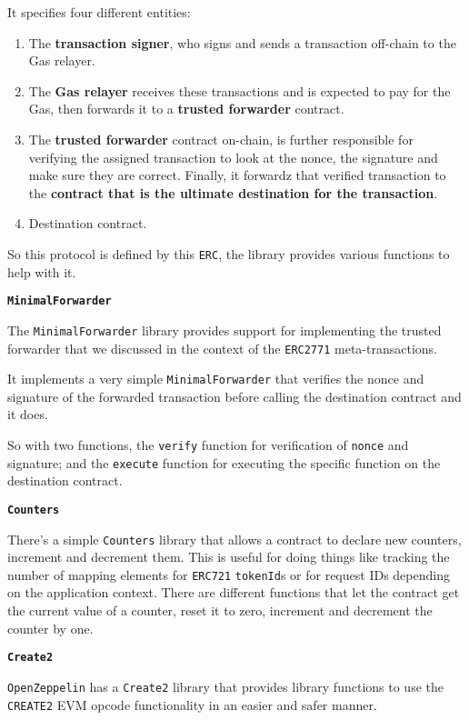 It specifies four different entities:

\begin{enumerate}
\def\labelenumi{\arabic{enumi}.}
\tightlist
\item
  The \textbf{transaction signer}, who signs and sends a transaction
  off-chain to the Gas relayer.
\item
  The \textbf{Gas relayer} receives these transactions and is expected
  to pay for the Gas, then forwards it to a \textbf{trusted forwarder}
  contract.
\item
  The \textbf{trusted forwarder} contract on-chain, is further
  responsible for verifying the assigned transaction to look at the
  nonce, the signature and make sure they are correct. Finally, it
  forwardz that verified transaction to the \textbf{contract that is the
  ultimate destination for the transaction}.
\item
  Destination contract.
\end{enumerate}

So this protocol is defined by this \texttt{ERC}, the library provides
various functions to help with it.

\textbf{\texttt{MinimalForwarder}}

The \texttt{MinimalForwarder} library provides support for implementing
the trusted forwarder that we discussed in the context of the
\texttt{ERC2771} meta-transactions.

It implements a very simple \texttt{MinimalForwarder} that verifies the
nonce and signature of the forwarded transaction before calling the
destination contract and it does.

So with two functions, the \texttt{verify} function for verification of
\texttt{nonce} and signature; and the \texttt{execute} function for
executing the specific function on the destination contract.

\textbf{\texttt{Counters}}

There's a simple \texttt{Counters} library that allows a contract to
declare new counters, increment and decrement them. This is useful for
doing things like tracking the number of mapping elements for
\texttt{ERC721} \texttt{tokenId}s or for request IDs depending on the
application context. There are different functions that let the contract
get the current value of a counter, reset it to zero, increment and
decrement the counter by one.

\textbf{\texttt{Create2}}

\texttt{OpenZeppelin} has a \texttt{Create2} library that provides
library functions to use the \texttt{CREATE2} EVM opcode functionality
in an easier and safer manner.

